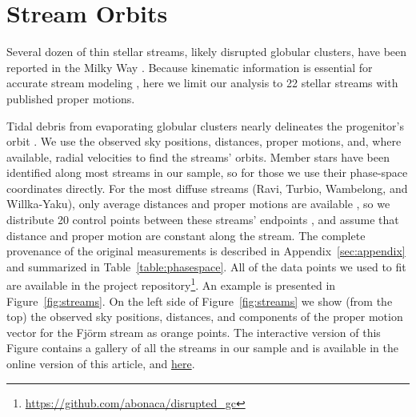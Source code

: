 \documentclass[twocolumn]{aastex63}
\newcommand{\package}[1]{\textsl{#1}}
\begin{document}
\section{Stream Orbits}
\label{sec:orbits}

Several dozen of thin stellar streams, likely disrupted globular clusters, have been reported in the Milky Way \citep[an up-to-date list is available in the \package{galstreams} package,][]{mateu:2018}.
Because kinematic information is essential for accurate stream modeling \citep{bh:2018}, here we limit our analysis to 22 stellar streams with published proper motions.

Tidal debris from evaporating globular clusters nearly delineates the progenitor's orbit \citep[e.g.,][]{kupper:2012}.
We use the observed sky positions, distances, proper motions, and, where available, radial velocities to find the streams' orbits.
Member stars have been identified along most streams in our sample, so for those we use their phase-space coordinates directly.
For the most diffuse streams (Ravi, Turbio, Wambelong, and Willka-Yaku), only average distances and proper motions are available \citep{shipp:2019}, so we distribute 20 control points between these streams' endpoints \citep{riley:2020}, and assume that distance and proper motion are constant along the stream.
The complete provenance of the original measurements is described in Appendix~\ref{sec:appendix} and summarized in Table~\ref{table:phasespace}.
All of the data points we used to fit are available in the project repository\footnote{\url{https://github.com/abonaca/disrupted_gc}}.
An example is presented in Figure~\ref{fig:streams}. On the left side of Figure~\ref{fig:streams} we show (from the top) the observed sky positions, distances, and components of the proper motion vector for the Fj\" orm stream as orange points.
The interactive version of this Figure contains a gallery of all the streams in our sample and is available in the online version of this article, and \href{https://www.cfa.harvard.edu/~abonaca/stream_gallery/gallery.html}{here}.
\end{document}
